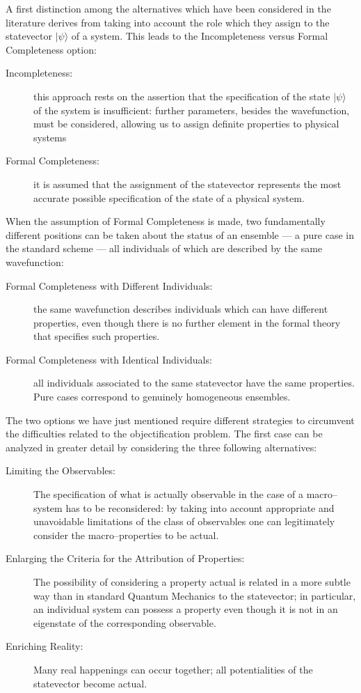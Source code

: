 \documentclass[10pt,a4paper]{article}
\begin{document}
A first distinction among the alternatives which have been
considered in the literature derives from taking into account the
role which they assign to the statevector $|\psi\rangle$ of a
system. This leads to the Incompleteness versus Formal
Completeness option:
\begin{description}
\item[Incompleteness:] this approach rests on the assertion  that
the specification of the state $|\psi\rangle$ of the system is
insufficient: further parameters, besides the wavefunction, must
be considered, allowing us to assign definite properties to
physical systems
\item[Formal Completeness:] it is assumed that the assignment of
the statevector represents the most accurate possible
specification of the state of a physical system.
\end{description}
When the assumption of Formal Completeness is made, two
fundamentally different positions can be taken about the status of
an ensemble --- a pure case in the standard scheme --- all
individuals of which are described by the same wavefunction:
\begin{description}
\item[Formal Completeness with Different Individuals:] the same
wavefunction de\-scri\-bes individuals which can have different
properties, even though there is no further element in the formal
theory that specifies such properties.
\item[Formal Completeness with Identical Individuals:] all
individuals associated to the same statevector have the same
properties. Pure cases correspond to genuinely homogeneous
ensembles.
\end{description}
The two options we have just mentioned require different
strategies to circumvent the difficulties related to the
objectification problem. The first case can be analyzed in greater
detail by considering the three following alternatives:
\begin{description}
\item[Limiting the Observables:] The specification of what is
actually observable in the case of a macro--system has to be
reconsidered: by taking into account appropriate and unavoidable
limitations of the class of observables one can legitimately
consider the macro--properties to be actual.
\item[Enlarging the Criteria for the Attribution of Properties:] The
possibility of considering a property actual is related in a more
subtle way than in standard Quantum Mechanics to the statevector;
in particular, an individual system can possess a property even
though it is not in an eigenstate of the corresponding observable.
\item[Enriching Reality:] Many real happenings can occur together;
all potentialities of the statevector become actual.
\end{description}
\end{document}
